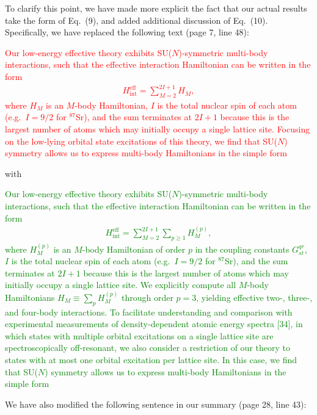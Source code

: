 \documentclass[preprint]{revtex4-1}
\renewcommand{\t}{\text} %
\newcommand{\1}{\mathds{1}}
\newcommand{\red}[1]{\textcolor{red}{#1}}
\newcommand{\green}[1]{\textcolor{green}{#1}}
\begin{document}
\begin{enumerate}
  To clarify this point, we have made more explicit the fact that our
  actual results take the form of Eq.~(9), and added additional
  discussion of Eq.~(10).  Specifically, we have replaced the
  following text (page 7, line 48):

  \red{Our low-energy effective theory exhibits SU($N$)-symmetric
    multi-body interactions, such that the effective interaction
    Hamiltonian can be written in the form
    \begin{align}
      H_{\t{int}}^{\t{eff}} = \sum_{M=2}^{2I+1} H_M, \tag{9}
    \end{align}
    where $H_M$ is an $M$-body Hamiltonian, $I$ is the total nuclear
    spin of each atom (e.g.~$I=9/2$ for ${}^{87}$Sr), and the sum
    terminates at $2I+1$ because this is the largest number of atoms
    which may initially occupy a single lattice site.  Focusing on the
    low-lying orbital state excitations of this theory, we find that
    SU($N$) symmetry allows us to express multi-body Hamiltonians in
    the simple form}

  with

  \green{Our low-energy effective theory exhibits SU($N$)-symmetric
    multi-body interactions, such that the effective interaction
    Hamiltonian can be written in the form
    \begin{align}
      H_{\t{int}}^{\t{eff}} = \sum_{M=2}^{2I+1} \sum_{p\ge1} H_M^{(p)},
      \tag{9}
    \end{align}
    where $H_M^{(p)}$ is an $M$-body Hamiltonian of order $p$ in the
    coupling constants $G^{qr}_{st}$, $I$ is the total nuclear spin of
    each atom (e.g.~$I=9/2$ for ${}^{87}$Sr), and the sum terminates
    at $2I+1$ because this is the largest number of atoms which may
    initially occupy a single lattice site.  We explicitly compute all
    $M$-body Hamiltonians $H_M\equiv\sum_p H_M^{(p)}$ through order
    $p=3$, yielding effective two-, three-, and four-body
    interactions.  To facilitate understanding and comparison with
    experimental measurements of density-dependent atomic energy
    spectra [34], in which states with multiple orbital excitations on
    a single lattice site are spectroscopically off-resonant, we also
    consider a restriction of our theory to states with at most one
    orbital excitation per lattice site.  In this case, we find that
    SU($N$) symmetry allows us to express multi-body Hamiltonians in
    the simple form}

  We have also modified the following sentence in our summary (page
  28, line 43):


\end{enumerate}
\end{document}
